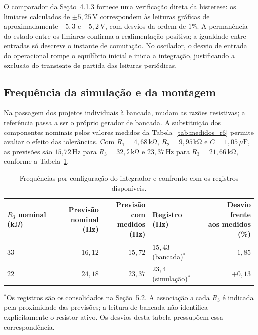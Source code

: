 \documentclass[11pt,a4paper]{article}
\begin{document}
O comparador da Seção~4.1.3 fornece uma verificação direta da histerese:
os limiares calculados de $\pm5{,}25\,\mathrm{V}$ correspondem às leituras
gráficas de aproximadamente $-5{,}3$ e $+5{,}2\,\mathrm{V}$, com desvios
da ordem de $1\%$. A permanência do estado entre os limiares confirma a
realimentação positiva; a igualdade entre entradas só descreve o instante
de comutação. No oscilador, o desvio de entrada do operacional rompe o
equilíbrio inicial e inicia a integração, justificando a exclusão do
transiente de partida das leituras periódicas.

\subsection{Frequência da simulação e da montagem}

Na passagem dos projetos individuais à bancada, mudam as razões
resistivas; a referência passa a ser o próprio gerador de bancada.
A substituição dos componentes nominais pelos valores medidos da
Tabela~\ref{tab:medidos_r6} permite avaliar o efeito das tolerâncias. Com $R_1=4{,}68\,\mathrm{k\Omega}$,
$R_2=9{,}95\,\mathrm{k\Omega}$ e $C=1{,}05\,\mu\mathrm{F}$,
as previsões são $15{,}72\,\mathrm{Hz}$ para
$R_3=32{,}2\,\mathrm{k\Omega}$ e $23{,}37\,\mathrm{Hz}$ para
$R_3=21{,}66\,\mathrm{k\Omega}$, conforme a
Tabela~\ref{tab:disc-frequencia-bancada}.

\begin{table}[H]
\centering
\caption{Frequências por configuração do integrador e confronto com os registros disponíveis.}
\label{tab:disc-frequencia-bancada}
\small
\begin{tabular}{@{}lrrlr@{}}
\toprule
\shortstack{$R_3$ nominal\\(k$\Omega$)}
& \shortstack{Previsão\\nominal (Hz)}
& \shortstack{Previsão com\\medidos (Hz)}
& Registro (Hz) & \shortstack{Desvio frente\\aos medidos (\%)}\\
\midrule
$33$ & $16{,}12$ & $15{,}72$ & $15{,}43$ (bancada)$^{*}$ & $-1{,}85$\\
$22$ & $24{,}18$ & $23{,}37$ & $23{,}4$ (simulação)$^{*}$ & $+0{,}13$\\
\bottomrule
\end{tabular}

\vspace{3pt}
\begin{minipage}{0.97\linewidth}\footnotesize
$^{*}$Os registros são os consolidados na Seção~5.2.
A associação a cada $R_3$ é indicada pela proximidade das previsões;
a leitura de bancada não identifica explicitamente o resistor ativo.
Os desvios desta tabela pressupõem essa correspondência.
\end{minipage}
\end{table}
\end{document}
